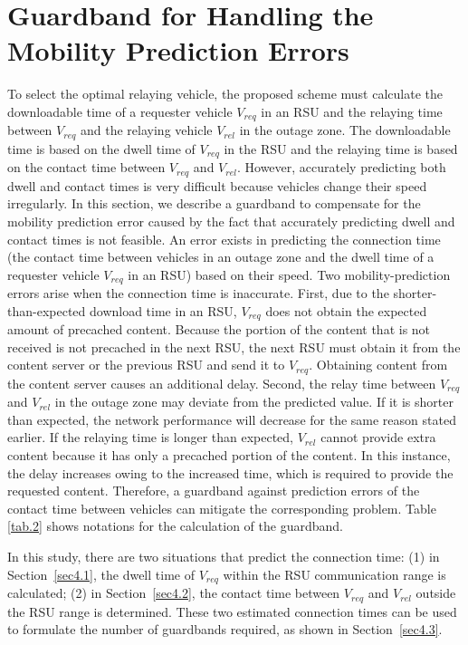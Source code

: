 \documentclass[electronics,aricle,accept,pdftex,moreauthors]{Definitions/mdpi}
\begin{document}
\section{Guardband for Handling the Mobility Prediction Errors} \label{sec4}
To select the optimal relaying vehicle, the proposed scheme must calculate the downloadable time of a requester vehicle ${V}_{req}$ in an RSU and the relaying time between ${V}_{req}$ and the relaying vehicle ${V}_{rel}$ in the outage zone. The downloadable time is based on the dwell time of ${V}_{req}$ in the RSU and the relaying time is based on the contact time between ${V}_{req}$ and ${V}_{rel}$.
However, accurately predicting both dwell and contact times is very difficult because vehicles change their speed irregularly. In this section, we describe a guardband to compensate for the mobility prediction error caused by the fact that accurately predicting dwell and contact times is not feasible. An error exists in predicting the connection time (the contact time between vehicles in an outage zone and the dwell time of a requester vehicle ${V}_{req}$ in an RSU) based on their speed.
Two mobility-prediction errors arise when the connection time is inaccurate. First, due to the shorter-than-expected download time in an RSU, $V_{req}$ does not obtain the expected amount of precached content. Because the portion of the content that is not received is not precached in the next RSU, the next RSU must obtain it from the content server or the previous RSU and send it to $V_{req}$.
Obtaining content from the content server causes an additional delay. Second, the relay time between $V_{req}$ and $V_{rel}$ in the outage zone may deviate from the predicted value. If it is shorter than expected, the network performance will decrease for the same reason stated earlier. If the relaying time is longer than expected, $V_{rel}$ cannot provide extra content because it has only a precached portion of the content. In this instance, the delay increases owing to the increased time, which is required to provide the requested content. Therefore, a guardband against prediction errors of the contact time between vehicles can mitigate the corresponding problem.
Table \ref{tab.2} shows notations for the calculation of the guardband.

In this study, there are two situations that predict the connection time: (1) in Section~\ref{sec4.1}, the dwell time of ${V}_{req}$ within the RSU communication range is calculated; (2) in Section~\ref{sec4.2}, the contact time between ${V}_{req}$ and ${V}_{rel}$ outside the RSU range is determined. These two estimated connection times can be used to formulate the number of guardbands required, as shown in Section~\ref{sec4.3}.
\end{document}
